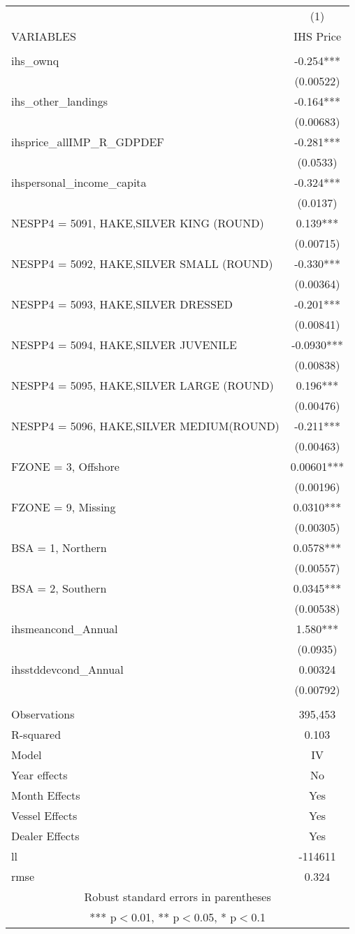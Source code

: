 \begin{tabular}{lc} \hline
 & (1) \\
VARIABLES & IHS Price \\ \hline
 &  \\
ihs\_ownq & -0.254*** \\
 & (0.00522) \\
ihs\_other\_landings & -0.164*** \\
 & (0.00683) \\
ihsprice\_allIMP\_R\_GDPDEF & -0.281*** \\
 & (0.0533) \\
ihspersonal\_income\_capita & -0.324*** \\
 & (0.0137) \\
NESPP4 = 5091, HAKE,SILVER KING (ROUND) & 0.139*** \\
 & (0.00715) \\
NESPP4 = 5092, HAKE,SILVER SMALL (ROUND) & -0.330*** \\
 & (0.00364) \\
NESPP4 = 5093, HAKE,SILVER DRESSED & -0.201*** \\
 & (0.00841) \\
NESPP4 = 5094, HAKE,SILVER JUVENILE & -0.0930*** \\
 & (0.00838) \\
NESPP4 = 5095, HAKE,SILVER LARGE (ROUND) & 0.196*** \\
 & (0.00476) \\
NESPP4 = 5096, HAKE,SILVER MEDIUM(ROUND) & -0.211*** \\
 & (0.00463) \\
FZONE = 3, Offshore & 0.00601*** \\
 & (0.00196) \\
FZONE = 9, Missing & 0.0310*** \\
 & (0.00305) \\
BSA = 1, Northern & 0.0578*** \\
 & (0.00557) \\
BSA = 2, Southern & 0.0345*** \\
 & (0.00538) \\
ihsmeancond\_Annual & 1.580*** \\
 & (0.0935) \\
ihsstddevcond\_Annual & 0.00324 \\
 & (0.00792) \\
 &  \\
Observations & 395,453 \\
R-squared & 0.103 \\
Model & IV \\
Year effects & No \\
Month Effects & Yes \\
Vessel Effects & Yes \\
Dealer Effects & Yes \\
ll & -114611 \\
 rmse & 0.324 \\ \hline
\multicolumn{2}{c}{ Robust standard errors in parentheses} \\
\multicolumn{2}{c}{ *** p$<$0.01, ** p$<$0.05, * p$<$0.1} \\
\end{tabular}
